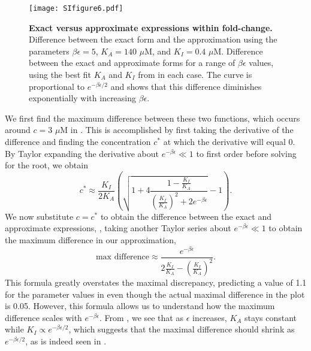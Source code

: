 \begin{figure}[h]
	\centering \texttt{[image: SIfigure6.pdf]} \caption{{\bf Exact versus
			approximate expressions within fold-change.}  Difference between
		the exact form \eref[eqSIstep2] and the approximation \eref[eqSIstep3] using
		the parameters $\beta \epsilon = 5$, $K_A = 140\,\,\mu\text{M}$, and $K_I =
		0.4\,\,\mu\text{M}$.  Difference between the exact and
		approximate forms for a range of $\beta \epsilon$ values, using the best fit
		$K_A$ and $K_I$ from \fref[SIfig5] in each case. The curve is
		proportional to $e^{-\beta \epsilon/2}$ and shows that this difference
		diminishes exponentially with increasing $\beta \epsilon$.} \label{SIfig6}
\end{figure}

We first find the maximum difference between these two functions, which occurs
around $c = 3\,\,\mu\text{M}$ in \fref[SIfig6]. This is accomplished by first
taking the derivative of the difference and finding the concentration $c^*$ at
which the derivative will equal 0. By Taylor expanding the derivative about
$e^{- \beta \epsilon} \ll 1$ to first order before solving for the root, we
obtain
\begin{equation}
c^* \approx \frac{K_I}{2 K_A} \left( \sqrt{1+4\frac{1-\frac{K_I}{K_A}}{\left( \frac{K_I}{K_A} \right)^2 + 2 e^{- \beta \epsilon}}} - 1 \right).
\end{equation}
We now substitute $c=c^*$ to obtain the difference between the exact
and approximate expressions, \eref[eqSIstep2][eqSIstep3], taking another Taylor
series about $e^{- \beta \epsilon} \ll 1$ to obtain the maximum difference in
our approximation,
\begin{equation}
\text{max difference} \approx \frac{e^{- \beta \epsilon}}{2 \frac{K_I}{K_A} - \left( \frac{K_I}{K_A} \right)^2}.
\end{equation}
This formula greatly overstates the maximal discrepancy, predicting a value of
1.1 for the parameter values in \fref[SIfig6] even though the actual
maximal difference in the plot is 0.05. However, this formula allows us to
understand how the maximum difference scales with $e^{- \beta \epsilon}$. From
\fref[SIfig5], we see that as $\epsilon$ increases, $K_A$ stays
constant while $K_I \propto e^{-\beta \epsilon/2}$, which suggests that the
maximal difference should shrink as $e^{-\beta \epsilon/2}$, as is indeed seen
in \fref[SIfig6].

\pagebreak
